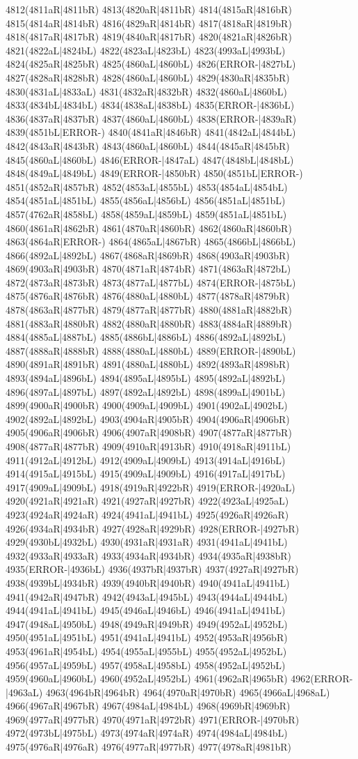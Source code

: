 4812(4811aR|4811bR) 4813(4820aR|4811bR) 4814(4815aR|4816bR) 4815(4814aR|4814bR) 4816(4829aR|4814bR) 4817(4818aR|4819bR) 4818(4817aR|4817bR) 4819(4840aR|4817bR) 4820(4821aR|4826bR) 4821(4822aL|4824bL) 4822(4823aL|4823bL) 4823(4993aL|4993bL) 4824(4825aR|4825bR) 4825(4860aL|4860bL) 4826(ERROR-|4827bL) 4827(4828aR|4828bR) 4828(4860aL|4860bL) 4829(4830aR|4835bR) 4830(4831aL|4833aL) 4831(4832aR|4832bR) 4832(4860aL|4860bL) 4833(4834bL|4834bL) 4834(4838aL|4838bL) 4835(ERROR-|4836bL) 4836(4837aR|4837bR) 4837(4860aL|4860bL) 4838(ERROR-|4839aR) 4839(4851bL|ERROR-) 4840(4841aR|4846bR) 4841(4842aL|4844bL) 4842(4843aR|4843bR) 4843(4860aL|4860bL) 4844(4845aR|4845bR) 4845(4860aL|4860bL) 4846(ERROR-|4847aL) 4847(4848bL|4848bL) 4848(4849aL|4849bL) 4849(ERROR-|4850bR) 4850(4851bL|ERROR-) 4851(4852aR|4857bR) 4852(4853aL|4855bL) 4853(4854aL|4854bL) 4854(4851aL|4851bL) 4855(4856aL|4856bL) 4856(4851aL|4851bL) 4857(4762aR|4858bL) 4858(4859aL|4859bL) 4859(4851aL|4851bL) 4860(4861aR|4862bR) 4861(4870aR|4860bR) 4862(4860aR|4860bR) 4863(4864aR|ERROR-) 4864(4865aL|4867bR) 4865(4866bL|4866bL) 4866(4892aL|4892bL) 4867(4868aR|4869bR) 4868(4903aR|4903bR) 4869(4903aR|4903bR) 4870(4871aR|4874bR) 4871(4863aR|4872bL) 4872(4873aR|4873bR) 4873(4877aL|4877bL) 4874(ERROR-|4875bL) 4875(4876aR|4876bR) 4876(4880aL|4880bL) 4877(4878aR|4879bR) 4878(4863aR|4877bR) 4879(4877aR|4877bR) 4880(4881aR|4882bR) 4881(4883aR|4880bR) 4882(4880aR|4880bR) 4883(4884aR|4889bR) 4884(4885aL|4887bL) 4885(4886bL|4886bL) 4886(4892aL|4892bL) 4887(4888aR|4888bR) 4888(4880aL|4880bL) 4889(ERROR-|4890bL) 4890(4891aR|4891bR) 4891(4880aL|4880bL) 4892(4893aR|4898bR) 4893(4894aL|4896bL) 4894(4895aL|4895bL) 4895(4892aL|4892bL) 4896(4897aL|4897bL) 4897(4892aL|4892bL) 4898(4899aL|4901bL) 4899(4900aR|4900bR) 4900(4909aL|4909bL) 4901(4902aL|4902bL) 4902(4892aL|4892bL) 4903(4904aR|4905bR) 4904(4906aR|4906bR) 4905(4906aR|4906bR) 4906(4907aR|4908bR) 4907(4877aR|4877bR) 4908(4877aR|4877bR) 4909(4910aR|4913bR) 4910(4918aR|4911bL) 4911(4912aL|4912bL) 4912(4909aL|4909bL) 4913(4914aL|4916bL) 4914(4915aL|4915bL) 4915(4909aL|4909bL) 4916(4917aL|4917bL) 4917(4909aL|4909bL) 4918(4919aR|4922bR) 4919(ERROR-|4920aL) 4920(4921aR|4921aR) 4921(4927aR|4927bR) 4922(4923aL|4925aL) 4923(4924aR|4924aR) 4924(4941aL|4941bL) 4925(4926aR|4926aR) 4926(4934aR|4934bR) 4927(4928aR|4929bR) 4928(ERROR-|4927bR) 4929(4930bL|4932bL) 4930(4931aR|4931aR) 4931(4941aL|4941bL) 4932(4933aR|4933aR) 4933(4934aR|4934bR) 4934(4935aR|4938bR) 4935(ERROR-|4936bL) 4936(4937bR|4937bR) 4937(4927aR|4927bR) 4938(4939bL|4934bR) 4939(4940bR|4940bR) 4940(4941aL|4941bL) 4941(4942aR|4947bR) 4942(4943aL|4945bL) 4943(4944aL|4944bL) 4944(4941aL|4941bL) 4945(4946aL|4946bL) 4946(4941aL|4941bL) 4947(4948aL|4950bL) 4948(4949aR|4949bR) 4949(4952aL|4952bL) 4950(4951aL|4951bL) 4951(4941aL|4941bL) 4952(4953aR|4956bR) 4953(4961aR|4954bL) 4954(4955aL|4955bL) 4955(4952aL|4952bL) 4956(4957aL|4959bL) 4957(4958aL|4958bL) 4958(4952aL|4952bL) 4959(4960aL|4960bL) 4960(4952aL|4952bL) 4961(4962aR|4965bR) 4962(ERROR-|4963aL) 4963(4964bR|4964bR) 4964(4970aR|4970bR) 4965(4966aL|4968aL) 4966(4967aR|4967bR) 4967(4984aL|4984bL) 4968(4969bR|4969bR) 4969(4977aR|4977bR) 4970(4971aR|4972bR) 4971(ERROR-|4970bR) 4972(4973bL|4975bL) 4973(4974aR|4974aR) 4974(4984aL|4984bL) 4975(4976aR|4976aR) 4976(4977aR|4977bR) 4977(4978aR|4981bR) 